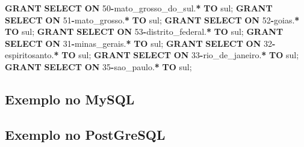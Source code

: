 \documentclass[
]{book}
\newenvironment{Shaded}{\begin{snugshade}}{\end{snugshade}}
\newcommand{\DecValTok}[1]{\textcolor[rgb]{0.00,0.00,0.81}{#1}}
\newcommand{\KeywordTok}[1]{\textcolor[rgb]{0.13,0.29,0.53}{\textbf{#1}}}
\newcommand{\NormalTok}[1]{#1}
\newcommand{\OperatorTok}[1]{\textcolor[rgb]{0.81,0.36,0.00}{\textbf{#1}}}
\newcommand{\StringTok}[1]{\textcolor[rgb]{0.31,0.60,0.02}{#1}}
\begin{document}
\begin{Shaded}
\begin{Highlighting}[]
\KeywordTok{GRANT} \KeywordTok{SELECT} \KeywordTok{ON}\NormalTok{ \textasciigrave{}}\DecValTok{50}\OperatorTok{{-}}\NormalTok{mato\_grosso\_do\_sul\textasciigrave{}.}\OperatorTok{*} \KeywordTok{TO} \StringTok{\textquotesingle{}sul\textquotesingle{}}\NormalTok{;}
\KeywordTok{GRANT} \KeywordTok{SELECT} \KeywordTok{ON}\NormalTok{ \textasciigrave{}}\DecValTok{51}\OperatorTok{{-}}\NormalTok{mato\_grosso\textasciigrave{}.}\OperatorTok{*}       \KeywordTok{TO} \StringTok{\textquotesingle{}sul\textquotesingle{}}\NormalTok{;}
\KeywordTok{GRANT} \KeywordTok{SELECT} \KeywordTok{ON}\NormalTok{ \textasciigrave{}}\DecValTok{52}\OperatorTok{{-}}\NormalTok{goias\textasciigrave{}.}\OperatorTok{*}             \KeywordTok{TO} \StringTok{\textquotesingle{}sul\textquotesingle{}}\NormalTok{;}
\KeywordTok{GRANT} \KeywordTok{SELECT} \KeywordTok{ON}\NormalTok{ \textasciigrave{}}\DecValTok{53}\OperatorTok{{-}}\NormalTok{distrito\_federal\textasciigrave{}.}\OperatorTok{*}  \KeywordTok{TO} \StringTok{\textquotesingle{}sul\textquotesingle{}}\NormalTok{;}
\KeywordTok{GRANT} \KeywordTok{SELECT} \KeywordTok{ON}\NormalTok{ \textasciigrave{}}\DecValTok{31}\OperatorTok{{-}}\NormalTok{minas\_gerais\textasciigrave{}.}\OperatorTok{*}      \KeywordTok{TO} \StringTok{\textquotesingle{}sul\textquotesingle{}}\NormalTok{;}
\KeywordTok{GRANT} \KeywordTok{SELECT} \KeywordTok{ON}\NormalTok{ \textasciigrave{}}\DecValTok{32}\OperatorTok{{-}}\NormalTok{espiritosanto\textasciigrave{}.}\OperatorTok{*}     \KeywordTok{TO} \StringTok{\textquotesingle{}sul\textquotesingle{}}\NormalTok{;}
\KeywordTok{GRANT} \KeywordTok{SELECT} \KeywordTok{ON}\NormalTok{ \textasciigrave{}}\DecValTok{33}\OperatorTok{{-}}\NormalTok{rio\_de\_janeiro\textasciigrave{}.}\OperatorTok{*}    \KeywordTok{TO} \StringTok{\textquotesingle{}sul\textquotesingle{}}\NormalTok{;}
\KeywordTok{GRANT} \KeywordTok{SELECT} \KeywordTok{ON}\NormalTok{ \textasciigrave{}}\DecValTok{35}\OperatorTok{{-}}\NormalTok{sao\_paulo\textasciigrave{}.}\OperatorTok{*}         \KeywordTok{TO} \StringTok{\textquotesingle{}sul\textquotesingle{}}\NormalTok{;}
\end{Highlighting}
\end{Shaded}

\subsection{Exemplo no MySQL}\label{exemplo-no-mysql}

\subsection{Exemplo no PostGreSQL}\label{exemplo-no-postgresql}
\end{document}
